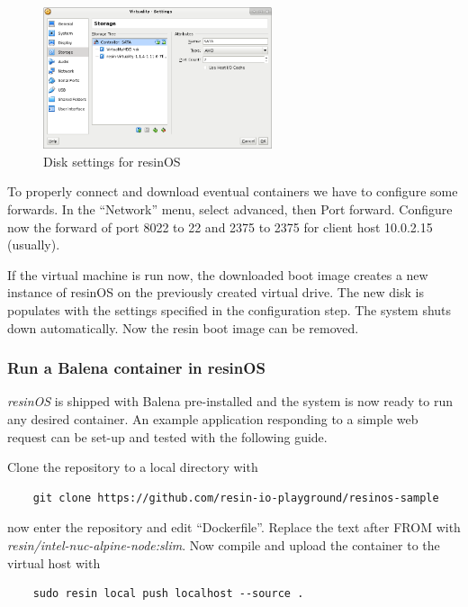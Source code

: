 \documentclass[]{scrartcl}
\begin{document}
\begin{figure}
	\centering
	\includegraphics[width=0.6\textwidth]{resin-vbox2}
	\caption{Disk settings for resinOS}
	\label{fig:resindisk}
\end{figure}

To properly connect and download eventual containers we have to configure some forwards. In the ``Network'' menu, select advanced, then Port forward. Configure now the forward of port 8022 to 22  and 2375 to 2375 for client host 10.0.2.15 (usually).

If the virtual machine is run now, the downloaded boot image creates a new instance of resinOS on the previously created virtual drive. The new disk is populates with the settings specified in the configuration step. The system shuts down automatically. Now the resin boot image can be removed.

\subsubsection{Run a Balena container in resinOS}

\textit{resinOS} is shipped with Balena pre-installed and the system is now ready to run any desired container. 
An example application responding to a simple web request can be set-up and tested with the following guide.

Clone the repository to a local directory with
\begin{verbatim}
	git clone https://github.com/resin-io-playground/resinos-sample
\end{verbatim}

now enter the repository and edit ``Dockerfile''. Replace the text after FROM with \textit{resin/intel-nuc-alpine-node:slim}. Now compile and upload the container to the virtual host with

\begin{verbatim}
	sudo resin local push localhost --source .
\end{verbatim}
\end{document}
